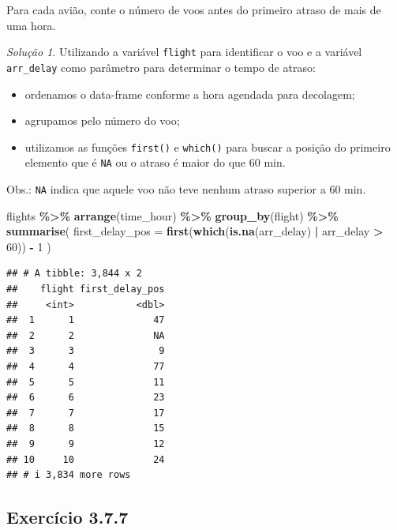 \documentclass[
]{latex/krantz}
\newenvironment{Shaded}{\begin{snugshade}}{\end{snugshade}}
\newcommand{\AttributeTok}[1]{\textcolor[rgb]{0.13,0.29,0.53}{#1}}
\newcommand{\DecValTok}[1]{\textcolor[rgb]{0.00,0.00,0.81}{#1}}
\newcommand{\FunctionTok}[1]{\textcolor[rgb]{0.13,0.29,0.53}{\textbf{#1}}}
\newcommand{\NormalTok}[1]{#1}
\newcommand{\SpecialCharTok}[1]{\textcolor[rgb]{0.81,0.36,0.00}{\textbf{#1}}}
\providecommand{\tightlist}{%
  \setlength{\itemsep}{0pt}\setlength{\parskip}{0pt}}
\theoremstyle{definition}
\theoremstyle{definition}
\theoremstyle{definition}
\theoremstyle{definition}
\theoremstyle{remark}
\newtheorem*{solution}{Solução}
\begin{document}
Para cada avião, conte o número de voos antes do primeiro atraso de mais de uma hora.

\begin{solution}

Utilizando a variável \texttt{flight} para identificar o voo e a variável \texttt{arr\_delay} como parâmetro para determinar o tempo de atraso:

\begin{itemize}
\tightlist
\item
  ordenamos o data-frame conforme a hora agendada para decolagem;
\item
  agrupamos pelo número do voo;
\item
  utilizamos as funções \texttt{first()} e \texttt{which()} para buscar a posição do primeiro elemento que é \texttt{NA} ou o atraso é maior do que 60 min.
\end{itemize}

Obs.: \texttt{NA} indica que aquele voo não teve nenhum atraso superior a 60 min.

\begin{Shaded}
\begin{Highlighting}[]
\NormalTok{flights }\SpecialCharTok{\%\textgreater{}\%}
    \FunctionTok{arrange}\NormalTok{(time\_hour) }\SpecialCharTok{\%\textgreater{}\%}    
    \FunctionTok{group\_by}\NormalTok{(flight) }\SpecialCharTok{\%\textgreater{}\%}
    \FunctionTok{summarise}\NormalTok{(}
        \AttributeTok{first\_delay\_pos =} \FunctionTok{first}\NormalTok{(}\FunctionTok{which}\NormalTok{(}\FunctionTok{is.na}\NormalTok{(arr\_delay) }\SpecialCharTok{|}\NormalTok{ arr\_delay }\SpecialCharTok{\textgreater{}} \DecValTok{60}\NormalTok{)) }\SpecialCharTok{{-}} \DecValTok{1}
\NormalTok{    )}
\end{Highlighting}
\end{Shaded}

\begin{verbatim}
## # A tibble: 3,844 x 2
##    flight first_delay_pos
##     <int>           <dbl>
##  1      1              47
##  2      2              NA
##  3      3               9
##  4      4              77
##  5      5              11
##  6      6              23
##  7      7              17
##  8      8              15
##  9      9              12
## 10     10              24
## # i 3,834 more rows
\end{verbatim}

\end{solution}

\hypertarget{exr3-7-7}{%
\subsection*{Exercício 3.7.7}\label{exr3-7-7}}
\end{document}
